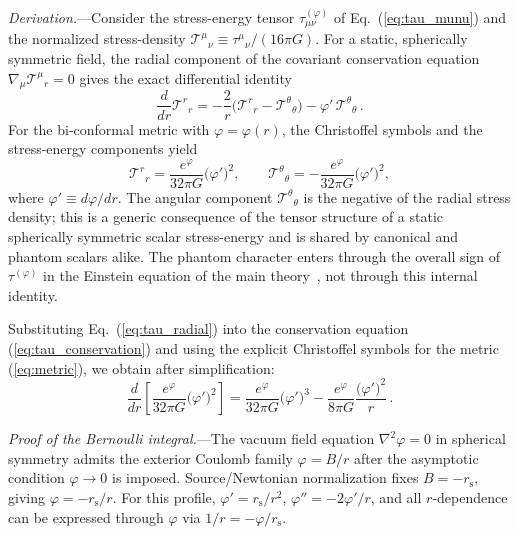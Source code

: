 \documentclass[aps,prd,onecolumn,superscriptaddress,nofootinbib,showpacs,12pt,notitlepage]{revtex4-2}
\newcommand{\rs}{r_{\mathrm{s}}}
\begin{document}
\textit{Derivation.}---Consider the stress-energy tensor
$\tau_{\mu\nu}^{(\varphi)}$ of Eq.~(\ref{eq:tau_munu}) and
the normalized stress-density
\(\mathcal{T}^{\mu}{}_{\nu}\equiv
\tau^{\mu}{}_{\nu}/(16\pi G)\).  For a static,
spherically symmetric field, the radial component of the
covariant conservation equation
$\nabla_\mu \mathcal{T}^{\mu}{}_r = 0$ gives the exact differential
identity
\begin{equation}\label{eq:tau_conservation}
  \frac{d}{dr}\mathcal{T}^r{}_r
  = -\frac{2}{r}\bigl(\mathcal{T}^r{}_r
  - \mathcal{T}^\theta{}_\theta\bigr)
  - \varphi'\,\mathcal{T}^\theta{}_\theta\,.
\end{equation}
For the bi-conformal metric with $\varphi = \varphi(r)$,
the Christoffel symbols and the stress-energy components yield
\begin{equation}\label{eq:tau_radial}
  \mathcal{T}^r{}_r
  = \frac{e^{\varphi}}{32\pi G}\bigl(\varphi'\bigr)^2, \qquad
  \mathcal{T}^\theta{}_\theta
  = -\frac{e^{\varphi}}{32\pi G}\bigl(\varphi'\bigr)^2,
\end{equation}
where $\varphi' \equiv d\varphi/dr$.  The angular component
$\mathcal{T}^\theta{}_\theta$ is the negative of the radial stress density;
this is a generic consequence of the tensor structure of a
static spherically symmetric scalar stress-energy and is shared
by canonical and phantom scalars alike.  The phantom character
enters through the overall sign of $\tau^{(\varphi)}$ in the
Einstein equation of the main theory~\cite{Lotishvili2026}, not
through this internal identity.

Substituting Eq.~(\ref{eq:tau_radial}) into the conservation
equation (\ref{eq:tau_conservation}) and using the explicit
Christoffel symbols for the metric (\ref{eq:metric}), we obtain
after simplification:
\begin{equation}\label{eq:bernoulli_derivation}
  \frac{d}{dr}\left[\frac{e^{\varphi}}{32\pi G}\bigl(\varphi'\bigr)^2\right]
  = \frac{e^{\varphi}}{32\pi G}\bigl(\varphi'\bigr)^3
  - \frac{e^{\varphi}}{8\pi G}\frac{\bigl(\varphi'\bigr)^2}{r}\,.
\end{equation}

\textit{Proof of the Bernoulli integral.}---The vacuum field
equation $\nabla^2\varphi = 0$ in spherical symmetry admits the
exterior Coulomb family $\varphi = B/r$ after the asymptotic
condition $\varphi \to 0$ is imposed.  Source/Newtonian
normalization fixes $B=-\rs$, giving
$\varphi = -\rs/r$.  For this profile, $\varphi' = \rs/r^2$,
$\varphi'' = -2\varphi'/r$, and all $r$-dependence can be
expressed through $\varphi$ via $1/r = -\varphi/\rs$.
\end{document}
